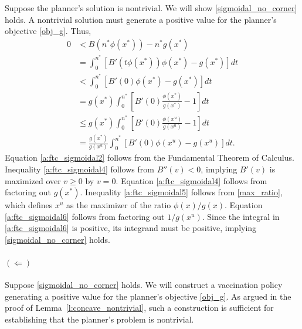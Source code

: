 \documentclass[12pt]{article}
\newcommand{\efficacy}{\phi}
\newcommand{\general}{g}
\newcommand{\benefit}{B}
\newcommand{\xun}{x^{u}}
\begin{document}
Suppose the planner's solution is nontrivial.  We will show
\eqref{sigmoidal_no_corner} holds. A nontrivial solution must generate
a positive value for the planner's objective \eqref{obj_g}. Thus,
\begin{align}
0 & < \benefit(n^*\efficacy(x^*)) - n^* \general(x^*) \label{a:ftc_sigmoidal1} \\
& = \int_0^{n^*} \left[ \benefit'(t\efficacy(x^*)) \efficacy(x^*) - \general(x^*) \right] dt \label{a:ftc_sigmoidal2} \\
& < \int_0^{n^*} \left[ \benefit'(0) \efficacy(x^*) - \general(x^*) \right] dt \label{a:ftc_sigmoidal3} \\
& = \general(x^*) \int_0^{n^*} \left[ \benefit'(0) \frac{\efficacy(x^*)}{\general(x^*)} - 1 \right] dt \label{a:ftc_sigmoidal4} \\
& \leq \general(x^*) \int_0^{n^*} \left[ \benefit'(0) \frac{\efficacy(\xun)}{\general(\xun)} - 1 \right] dt \label{a:ftc_sigmoidal5} \\
& = \frac{\general(x^*)}{\general(\xun)} \int_0^{n^*} \left[ \benefit'(0) \efficacy(\xun) - \general(\xun) \right] dt. \label{a:ftc_sigmoidal6} 
\end{align} 
Equation \eqref{a:ftc_sigmoidal2} follows from the Fundamental Theorem of Calculus. 
Inequality \eqref{a:ftc_sigmoidal4} follows from $\benefit''(v) < 0$,
implying $\benefit'(v)$ is maximized over $v \geq 0$ by $v =
0$. Equation \eqref{a:ftc_sigmoidal4} follows from factoring out $\general(x^*)$. Inequality \eqref{a:ftc_sigmoidal5} follows from \eqref{max_ratio}, which defines $\xun$ as the maximizer of the ratio $\efficacy(x) / \general(x)$. Equation \eqref{a:ftc_sigmoidal6} follows from factoring out $1/\general(\xun)$. 
Since the integral in \eqref{a:ftc_sigmoidal6} is positive, its
integrand must be positive, implying \eqref{sigmoidal_no_corner}
holds.

\paragraph{$(\Longleftarrow)$}

Suppose \eqref{sigmoidal_no_corner} holds. We will construct a
vaccination policy generating a positive value for the planner's
objective \eqref{obj_g}. As argued in the proof of
Lemma~\ref{l:concave_nontrivial}, such a construction is sufficient
for establishing that the planner's problem is nontrivial.
\end{document}
